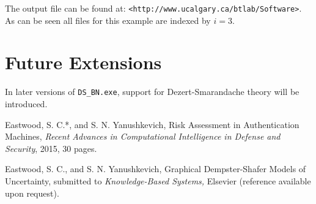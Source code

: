 \documentclass{article}
\begin{document}
The output file can be found at: \texttt{<http://www.ucalgary.ca/btlab/Software>}. As can be seen all files for this example are indexed by \(i = 3\). 


\section*{Future Extensions}

In later versions of \texttt{DS\_BN.exe}, support for Dezert-Smarandache theory will be introduced.



\begin{thebibliography}{9}

\bibitem{[EastwoodCIDS2015]}
Eastwood, S. C.*, and S. N. Yanushkevich, Risk Assessment in Authentication Machines, \emph{Recent Advances in Computational Intelligence in Defense and Security}, 2015, 30 pages.

\bibitem{[Eastwood2015]}
Eastwood, S. C., and S. N. Yanushkevich, Graphical Dempster-Shafer Models of Uncertainty, submitted to \emph{Knowledge-Based Systems,} Elsevier (reference available upon request).

\end{thebibliography}
\end{document}
